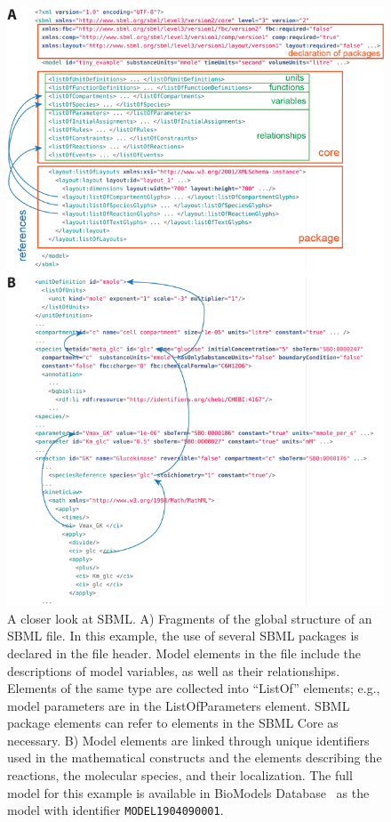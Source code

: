 \documentclass[]{draft-sbml-paper}
\begin{document}
\begin{figure}[htb]
   \center
   \includegraphics[width=.8\textwidth]{res/SBML_XML_example_v03.png}
 \caption{A closer look at SBML. A) Fragments of the global structure of an SBML file. In this example, the use of several SBML packages is declared in the file header. Model elements in the file include the descriptions of model variables, as well as their relationships.  Elements of the same type are collected into ``ListOf'' elements; e.g., model parameters are in the ListOfParameters element. SBML package elements can refer to elements in the SBML Core as necessary. B) Model elements are linked through unique identifiers used in the mathematical constructs and the elements describing the reactions, the molecular species, and their localization. The full model for this example is available in BioModels Database~\citep{chelliah2014biomodels, li2010biomodels} as the model with identifier \texttt{MODEL1904090001}.}
\label{fig:examples-sbml}
\end{figure}
\end{document}
